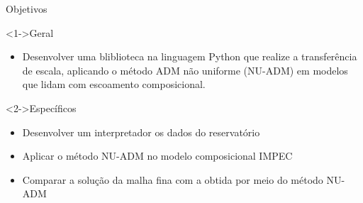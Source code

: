 \documentclass[professionalfont]{beamer}
\begin{document}
\begin{frame}{Objetivos}

    \begin{block}<1->{Geral}
        \begin{itemize}
            \item Desenvolver uma bliblioteca na linguagem Python que realize a transferência de escala, aplicando o método ADM não uniforme (NU-ADM) em modelos que lidam com escoamento composicional.
        \end{itemize}
    \end{block}

    \begin{block}<2->{Específicos}
        \begin{itemize}
            \item Desenvolver um interpretador os dados do reservatório
            \item Aplicar o método NU-ADM no modelo composicional IMPEC
            \item Comparar a solução da malha fina com a obtida por meio do método NU-ADM
        \end{itemize}
    \end{block}
    
\end{frame}

    
    
\end{document}
